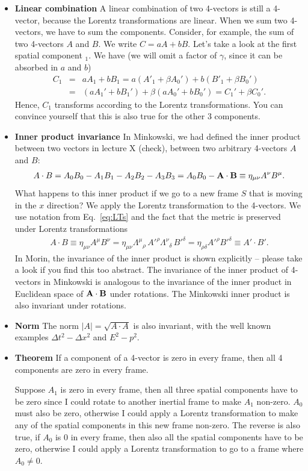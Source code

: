 \documentclass[12pt]{article}
\newcommand{\be}{\begin{eqnarray}}
\newcommand{\ee}{\end{eqnarray}}
\begin{document}
\begin{itemize}
\item {\bf Linear combination} A linear combination of two 4-vectors is still a 4-vector, because the Lorentz transformations are linear. When we sum two 4-vectors, we have to sum the components. Consider, for example, the sum of two 4-vectors $A$ and $B$. We write $C = aA + bB$. Let's take a look at the first spatial component $_1$. We have (we will omit a factor of $\gamma$, since it can be absorbed in $a$ and $b$)
\be
C_1 &=& aA_1 + bB_1 = a(A'_1 + \beta A_0') + b(B'_1 + \beta B_0') \nonumber \\
&=& (aA_1'+bB_1') + \beta(aA_0'+bB_0') = C_1'+\beta C_0'.
\ee
Hence, $C_1$ transforms according to the Lorentz transformations. You can convince yourself that this is also true for the other 3 components. 

\item {\bf Inner product invariance}
In Minkowski, we had defined the inner product between two vectors in lecture X (check), between two arbitrary 4-vectors $A$ and $B$:
\be
A\cdot B = A_0 B_0 - A_1B_1 - A_2B_2-A_3 B_3 = A_0 B_0 - {\bf A} \cdot {\bf B}\equiv \eta_{\mu \nu} A^{\nu} B^{\mu}.
\ee
What happens to this inner product if we go to a new frame $S$ that is moving in the $x$ direction? We apply the Lorentz transformation to the 4-vectors. We use notation from Eq.~\eqref{eq:LTs} and the fact that the metric is preserved under Lorentz transformations
\be
A\cdot B\equiv \eta_{\mu \nu} A^{\mu} B^{\nu} = \eta_{\mu \nu} \Lambda^{\mu}{}_{\rho} \, A'^{\rho}  \Lambda^{\nu}{}_{\delta} \, B'^{\delta}  = \eta_{\rho \delta} A'^{\rho} B'^{\delta} \equiv A'\cdot B'.
\ee
In Morin, the invariance of the inner product is shown explicitly -- please take a look if you find this too abstract. The invariance of the inner product of 4-vectors in Minkowski is analogous to the invariance of the inner product in Euclidean space of ${\bf A}\cdot {\bf B}$ under rotations. The Minkowski inner product is also invariant under rotations. 

\item {\bf Norm } The norm $|A| = \sqrt{A\cdot A}$ is also invariant, with the well known examples $\Delta t^2 - \Delta x^2$ and $E^2 - p^2$. 

\item {\bf Theorem} If a component of a 4-vector is zero in every frame, then all 4 components are zero in every frame.  

Suppose $A_1$ is zero in every frame, then all three spatial components have to be zero since I could rotate to another inertial frame to make $A_1$ non-zero. $A_0$ must also be zero, otherwise I could apply a Lorentz transformation to make any of the spatial components in this new frame non-zero. The reverse is also true, if $A_0$ is 0 in every frame, then also all the spatial components have to be zero, otherwise I could apply a Lorentz transformation to go to a frame where $A_0\neq 0$. 
\end{itemize}
\end{document}
